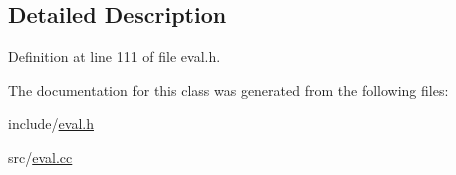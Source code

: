 \subsection{Detailed Description}


Definition at line 111 of file eval.\+h.



The documentation for this class was generated from the following files\+:\begin{DoxyCompactItemize}
\item 
include/\mbox{\hyperlink{eval_8h}{eval.\+h}}\item 
src/\mbox{\hyperlink{eval_8cc}{eval.\+cc}}\end{DoxyCompactItemize}
